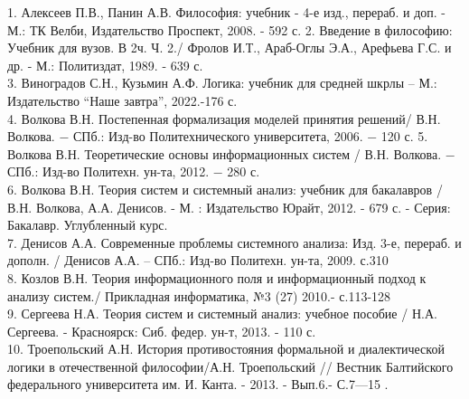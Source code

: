 \documentclass[a4paper,12pt]{report}
\begin{document}
1.  Алексеев П.В., Панин А.В. Философия: учебник - 4-е изд., перераб. и доп. - М.: ТК Велби, Издательство Проспект, 2008. - 592 с.
2. Введение в философию: Учебник для вузов. В 2ч. Ч. 2./ Фролов И.Т., Араб-Оглы Э.А., Арефьева Г.С. и др. - М.: Политиздат, 1989. - 639 с.\\
3. Виноградов С.Н., Кузьмин А.Ф. Логика: учебник для средней шкрлы – М.: Издательство “Наше завтра”, 2022.-176 с.\\
4. Волкова В.Н. Постепенная формализация моделей принятия решений/ В.Н. Волкова. −  СПб.: Изд-во Политехнического университета, 2006. − 120 с.
5. Волкова В.Н. Теоретические основы информационных систем / В.Н. Волкова. − СПб.: Изд-во Политехн. ун-та, 2012. − 280 с.\\
6. Волкова В.Н. Теория систем и системный анализ: учебник для бакалавров /В.Н. Волкова, А.А. Денисов. - М. : Издательство Юрайт, 2012. - 679 с. - Серия: Бакалавр. Углубленный курс.\\
7. Денисов А.А. Современные проблемы системного анализа: Изд. 3-е, перераб.  и дополн. / Денисов А.А. – СПб.: Изд-во Политехн. ун-та, 2009. с.310\\
8. Козлов В.Н. Теория информационного поля и информационный подход к анализу систем./ Прикладная информатика, №3 (27) 2010.- с.113-128\\
9. Сергеева Н.А. Теория систем и системный анализ: учебное пособие / Н.А. Сергеева. - Красноярск: Сиб. федер. ун-т, 2013. - 110 с.\\
10. Троепольский А.Н. История противостояния формальной и диалектической логики в отечественной философии/А.Н. Троепольский // Вестник Балтийского федерального университета им. И. Канта. - 2013. - Вып.6.- С.7—15 .

    
    
    
   	
\end{document}
